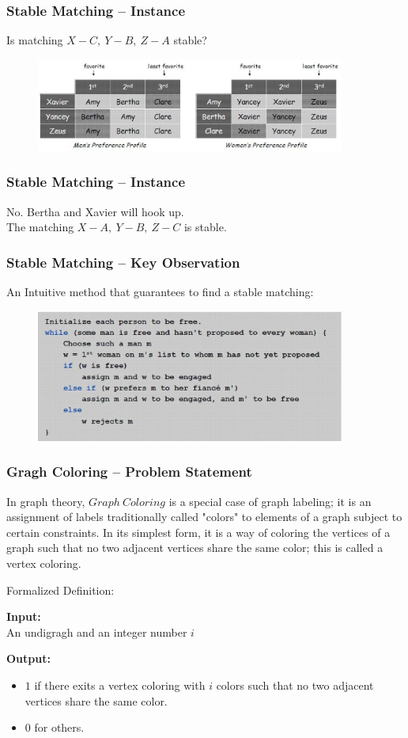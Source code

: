 \documentclass[slidestop,compress,mathserif]{beamer}
\begin{document}
\frame
{
\frametitle{Stable Matching -- Instance}
Is matching $X-C,\ Y-B,\ Z-A$ stable?\\
\begin{figure}
 \includegraphics[width=4in] {1.eps}
\end{figure}


}
\frame
{
\frametitle{Stable Matching -- Instance}
No. Bertha and Xavier will hook up.\\
The matching $X-A,\ Y-B,\ Z-C$ is stable.
}
\frame
{
\frametitle{Stable Matching -- Key Observation}
An Intuitive method that guarantees to find a stable matching:\\
\begin{figure}
 \includegraphics[width=4in] {2.eps}
\end{figure}
}
\frame
{
\frametitle{Gragh Coloring -- Problem Statement}
In graph theory, $Graph \ Coloring$ is a special case of graph labeling; it is an assignment of labels traditionally called "colors" to elements of a graph subject to certain constraints. In its simplest form, it is a way of coloring the vertices of a graph such that no two adjacent vertices share the same color; this is called a vertex coloring.
\begin{block}{Formalized Definition:}

 {\bf Input: }\\
An undigragh and an integer number $i$

 {\bf Output: }\\
\begin{itemize}
  \item $1$ if there exits a vertex coloring with $i$ colors such that no two adjacent vertices share the same color.
  \item $0$ for others.
\end{itemize}


\end{block}
}
\end{document}
